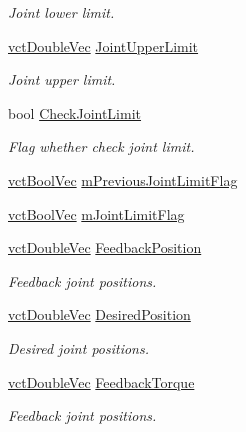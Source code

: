 \begin{DoxyCompactItemize}
\begin{DoxyCompactList}\small\item\em Joint lower limit. \end{DoxyCompactList}\item 
\hyperlink{vct_dynamic_vector_types_8h_ade4b3068c86fb88f41af2e5187e491c2}{vct\-Double\-Vec} \hyperlink{classmts_p_i_d_a6a6f2a5123f6816f47d5c752ba7020d5}{Joint\-Upper\-Limit}
\begin{DoxyCompactList}\small\item\em Joint upper limit. \end{DoxyCompactList}\item 
bool \hyperlink{classmts_p_i_d_a951636db1802cb277a716bd8ee8aea45}{Check\-Joint\-Limit}
\begin{DoxyCompactList}\small\item\em Flag whether check joint limit. \end{DoxyCompactList}\item 
\hyperlink{vct_dynamic_vector_types_8h_aeb2237c134aee3769198bd9d55c8a9e0}{vct\-Bool\-Vec} \hyperlink{classmts_p_i_d_a0e38e506730421183e327996dc056e6c}{m\-Previous\-Joint\-Limit\-Flag}
\item 
\hyperlink{vct_dynamic_vector_types_8h_aeb2237c134aee3769198bd9d55c8a9e0}{vct\-Bool\-Vec} \hyperlink{classmts_p_i_d_a3a4b1187f5526418da04efb25a4949ba}{m\-Joint\-Limit\-Flag}
\item 
\hyperlink{vct_dynamic_vector_types_8h_ade4b3068c86fb88f41af2e5187e491c2}{vct\-Double\-Vec} \hyperlink{classmts_p_i_d_a52a65fa9afc1f295b483dcd4522244c3}{Feedback\-Position}
\begin{DoxyCompactList}\small\item\em Feedback joint positions. \end{DoxyCompactList}\item 
\hyperlink{vct_dynamic_vector_types_8h_ade4b3068c86fb88f41af2e5187e491c2}{vct\-Double\-Vec} \hyperlink{classmts_p_i_d_a261ceede64958a11dc2f2b58207a83e7}{Desired\-Position}
\begin{DoxyCompactList}\small\item\em Desired joint positions. \end{DoxyCompactList}\item 
\hyperlink{vct_dynamic_vector_types_8h_ade4b3068c86fb88f41af2e5187e491c2}{vct\-Double\-Vec} \hyperlink{classmts_p_i_d_a70a6622da968b22d790eebbbfa584c26}{Feedback\-Torque}
\begin{DoxyCompactList}\small\item\em Feedback joint positions. \end{DoxyCompactList}\item 

\end{DoxyCompactItemize}
